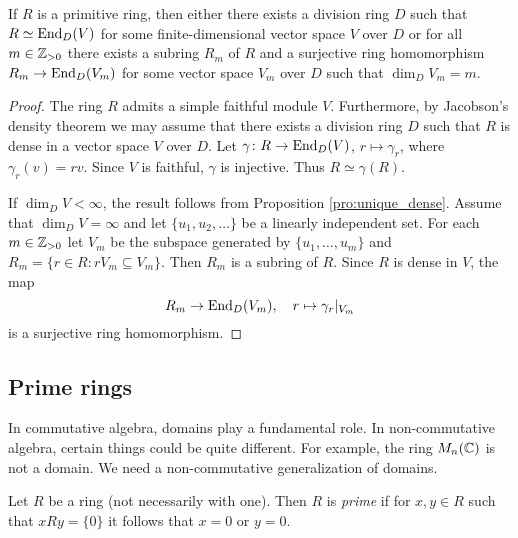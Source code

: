 
\begin{corollary}
	If $R$ is a primitive ring, then either there exists a division ring $D$
	such that $R\simeq\operatorname{End}_D(V)$ for some finite-dimensional vector space $V$ over $D$ or 
	for all $m\in\mathbb{Z}_{>0}$ there exists a subring $R_m$ of 
	$R$ and a surjective ring homomorphism $R_m\to\operatorname{End}_D(V_m)$ for some vector space  
	$V_m$ over $D$ such that $\dim_DV_m=m$.
\end{corollary}

\begin{proof}
	The ring $R$ admits a simple faithful module $V$. Furthermore, by Jacobson's density 
	theorem we may assume that there exists a division ring $D$ 
	such that $R$ is dense in a vector space $V$ over $D$. 
	Let $\gamma\colon R\to\operatorname{End}_D(V)$, $r\mapsto\gamma_r$, where 
	$\gamma_r(v)=rv$. Since $V$ is faithful, $\gamma$ is injective. Thus 
	$R\simeq\gamma(R)$. 

	If $\dim_DV<\infty$, the result follows from Proposition \ref{pro:unique_dense}. 
	Assume that $\dim_DV=\infty$ and let $\{u_1,u_2,\dots\}$ be a linearly independent set. 
	For each $m\in\mathbb{Z}_{>0}$ let $V_m$ be the subspace generated by $\{u_1,\dots,u_m\}$
	and $R_m=\{r\in R:rV_m\subseteq V_m\}$. Then $R_m$ is a subring of $R$. 
	Since $R$ is dense in $V$, the map 
	\[
		R_m\to \operatorname{End}_D(V_m),\quad
		r\mapsto\gamma_r|_{V_m}
	\]
	is a surjective ring homomorphism. 
\end{proof}

\subsection{Prime rings}

In commutative algebra, domains play a fundamental role. In non-commutative
algebra, certain things could be quite different. 
For example, the ring $M_n(\mathbb{C})$ is not a domain.
We need a non-commutative generalization of domains.

\begin{definition}
	Let $R$ be a ring (not necessarily with one). Then $R$ is
	\emph{prime} if for $x,y\in R$ such that $xRy=\{0\}$ it follows that $x=0$ or 
	$y=0$.
\end{definition}

